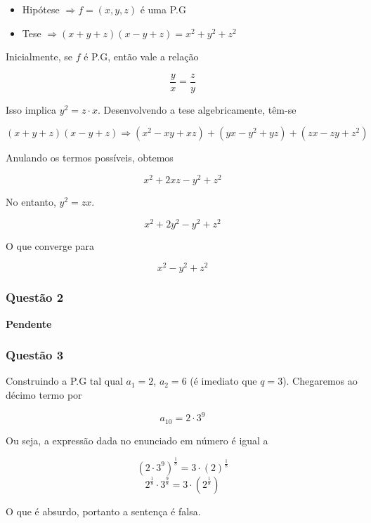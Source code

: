 \hrulefill

\begin{tcolorbox}[colback=LightYellow]
\begin{itemize}
        \item Hipótese $\Rightarrow f = (x, y, z)$ é uma P.G
        \vspace{0.2cm}
        \item Tese $\Rightarrow (x + y + z)(x - y + z) = x^{2} + y^{2} + z^{2}$
\end{itemize}
\end{tcolorbox}

Inicialmente, se $f$ é P.G, então vale a relação

\[\frac{y}{x} = \frac{z}{y}\]

Isso implica $y^{2} = z\cdot x$. Desenvolvendo a tese algebricamente, têm-se

\[(x + y + z)(x - y + z) \Rightarrow (x^{2} - xy + xz) + (yx - y^{2} + yz) + (zx - zy + z^{2})\]

Anulando os termos possíveis, obtemos

\[x^{2} + 2xz - y^{2} + z^{2}\]

No entanto, $y^{2} = zx$.

\[x^{2} + 2y^{2} - y^{2} + z^{2}\]

O que converge para

\[x^{2} - y^{2} + z^{2}\]

\subsubsection*{Questão 2}

\hrulefill

\textbf{Pendente}

\subsubsection*{Questão 3}

\hrulefill


Construindo a P.G tal qual $a_{1} = 2$, $a_{2} = 6$ (é imediato que $q = 3$). Chegaremos ao décimo termo por

\[a_{10} = 2\cdot 3^{9}\]

Ou seja, a expressão dada no enunciado em número é igual a

\[(2\cdot 3^{9})^{\frac{1}{8}} = 3\cdot (2)^{\frac{1}{8}}\]
\[2^{\frac{1}{8}} \cdot 3^{\frac{9}{8}} = 3\cdot (2^{\frac{1}{8}})\]

O que é absurdo, portanto a sentença é falsa.

